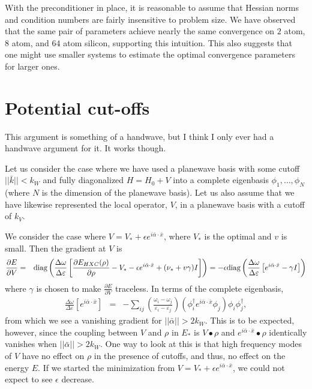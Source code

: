 \documentclass{article}
\newcommand{\beas}{\begin{eqnarray*}}
\newcommand{\enas}{\end{eqnarray*}}
\newcommand{\bea}{\begin{eqnarray}} \newcommand{\ena}{\end{eqnarray}}
\newcommand{\Vscp}{V}
\newcommand{\Red}{\color{red}}
\begin{document}
With the preconditioner in place, it is reasonable to assume that
Hessian norms and condition numbers are fairly insensitive to problem
size.  We have observed that the same pair of parameters achieve
nearly the same convergence on $2$ atom, $8$ atom, and $64$ atom
silicon, supporting this intuition.  This also suggests that one
might use smaller systems to estimate the optimal convergence
parameters for larger ones.

\section{Potential cut-offs}

{\Red This argument is something of a handwave, but I think I only
ever had a handwave argument for it. It works though.}

Let us consider the case where we have used a planewave basis with
some cutoff $||\bar{k}|| < k_W$ and fully diagonalized $H = H_0 + \Vscp$
into a complete eigenbasis $\phi_1,\ldots,\phi_N$ (where $N$ is the
dimension of the planewave basis).  Let us also assume that we have
likewise represented the local operator, $\Vscp$,
in a planewave basis with a cutoff of $k_V$.

We consider the case where
$\Vscp = \Vscp_* + \epsilon e^{i \bar{\alpha} \cdot \bar{x}}$,
where $\Vscp_*$ is the optimal and $v$ is small.  Then the gradient at
$\Vscp$ is
\beas
  \frac{\partial E}{\partial V}
  &=& \diag\left( \frac{\Delta \omega}{\Delta \varepsilon} \left[
       \frac{\partial E_{HXC}(\rho)}{\partial \rho}
       - \Vscp_* - \epsilon e^{i \bar{\alpha}\cdot \bar{x}}
       + (\nu_*+v \gamma) I
       \right]\right)
  = -\epsilon\diag\left( \frac{\Delta \omega}{\Delta \varepsilon} \left[
        e^{i \bar{\alpha}\cdot \bar{x}} - \gamma I
       \right]\right)
\enas
where $\gamma$ is chosen to make $\frac{\partial E}{\partial V}$
traceless.  In terms of the complete eigenbasis,
\bea
\label{deltar_eq}
  \frac{\Delta \omega}{\Delta \varepsilon}
       \left[
        e^{i \bar{\alpha}\cdot \bar{x}}
       \right]
  &=& - \sum_{ij}
    \left(\frac{\omega_i - \omega_j}{\varepsilon_i-\varepsilon_j}\right)
    \left(\phi_i^{\dagger} e^{i \bar{\alpha} \cdot \bar{x}} \phi_j\right)
    \phi_i \phi_j^{\dagger},
\ena
from which we see a vanishing gradient for $||\bar{\alpha}|| > 2 k_W$.
This is to be expected, however, since the coupling between $\Vscp$ and
$\rho$ in $E_*$ is $\Vscp \bullet \rho$ and
$e^{i \bar{\alpha} \cdot \bar{x}} \bullet \rho$ identically vanishes
when $||\bar{\alpha}|| > 2 k_W$.  One way to look at this is that high
frequency modes of $\Vscp$ have no effect on $\rho$ in the presence of
cutoffs, and thus, no effect on the energy $E$.  If we started the
minimization from
$\Vscp=\Vscp_* + \epsilon e^{i \bar{\alpha} \cdot \bar{x}}$, we could not
expect to see $\epsilon$ decrease.
\end{document}
